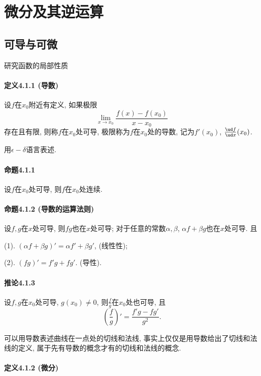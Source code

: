\section{微分及其逆运算}
\subsection{可导与可微}

研究函数的局部性质

\paragraph{定义4.1.1 (导数)}

设$f$在$x_{0}$附近有定义, 如果极限
\[
\lim_{x\to x_{0}}\frac{f(x)-f(x_{0})}{x-x_{0}}
\]
存在且有限, 则称$f$在$x_{0}$处可导, 极限称为$f$在$x_{0}$处的导数, 记为$f'(x_{0})$,
$\frac{\ud f}{\ud x}(x_{0})$.

用$\epsilon-\delta$语言表述.

\paragraph{命题4.1.1}

设$f$在$x_{0}$处可导, 则$f$在$x_{0}$处连续.

\paragraph{命题4.1.2 (导数的运算法则)}

设$f,g$在$x$处可导, 则$fg$也在$x$处可导; 对于任意的常数$\alpha,\beta$, $\alpha f+\beta g$也在$x$处可导.
且

(1). $(\alpha f+\beta g)'=\alpha f'+\beta g'$, (线性性);

(2). $(fg)'=f'g+fg'$. (导性).

\paragraph{推论4.1.3}

设$f,g$在$x_{0}$处可导, $g(x_{0})\ne0$, 则$\frac{f}{g}$在$x_{0}$处也可导,
且
\[
\left(\frac{f}{g}\right)'=\frac{f'g-fg'}{g^{2}}.
\]

可以用导数表述曲线在一点处的切线和法线, 事实上仅仅是用导数给出了切线和法线的定义, 属于先有导数的概念才有的切线和法线的概念.

\paragraph{定义4.1.2 (微分)}

